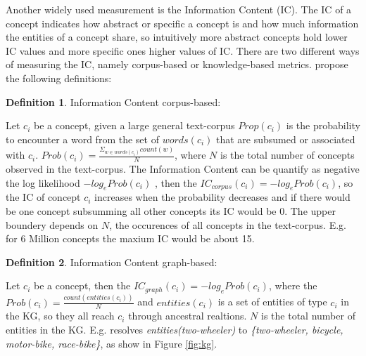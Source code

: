 \documentclass[pdftex,a4paper,12pt]{scrartcl}
\theoremstyle{definition}
\newtheorem{definition}{Definition}[section]
\begin{document}
Another widely used measurement is the Information Content (IC). The IC of a concept indicates how abstract or specific a concept is and how much information the entities of a concept share, so intuitively more abstract concepts hold lower IC values and more specific ones higher values of IC. There are two different ways of measuring the IC, namely corpus-based or knowledge-based metrics. \citet{zhu_computing_2017} propose the following definitions: 
\begin{definition}{Information Content corpus-based:}

Let $c_i$ be a concept, given a large general text-corpus $Prop(c_i)$ is the probability to encounter a word from the set of $words(c_i)$ that are subsumed or associated with $c_i$. $Prob(c_i)= \frac{\Sigma_{w\in words(c_i)} count(w)}{N}$, where $N$ is the total number of concepts observed in the text-corpus. The Information Content can be quantify as negative the log likelihood $-log_e Prob(c_i)$ \citep{resnik_using_nodate}, then the $IC_{corpus}(c_i) = -log_e Prob(c_i)$, so the IC of concept $c_i$ increases when the probability decreases and if there would be one concept subsumming all other concepts its IC would be $0$. The upper boundery depends on  $N$, the occurences of all concepts in the text-corpus. E.g. for 6 Million concepts the maxium IC would be about 15. 
\end{definition}
\begin{definition}{Information Content graph-based:}

Let $c_i$ be a concept, then the $IC_{graph}(c_i) = -log_e Prob(c_i)$, where the $Prob(c_i) = \frac{count(entities(c_i))}{N}$ and $entities(c_i)$ is a set of entities of type $c_i$ in the KG, so they all reach $c_i$ through ancestral realtions. $N$ is the total number of entities in the KG. E.g. resolves \textit{entities(two-wheeler)} to \textit{\{two-wheeler, bicycle, motor-bike, race-bike\}}, as show in Figure \ref{fig:kg}. 
\end{definition}

\end{document}
